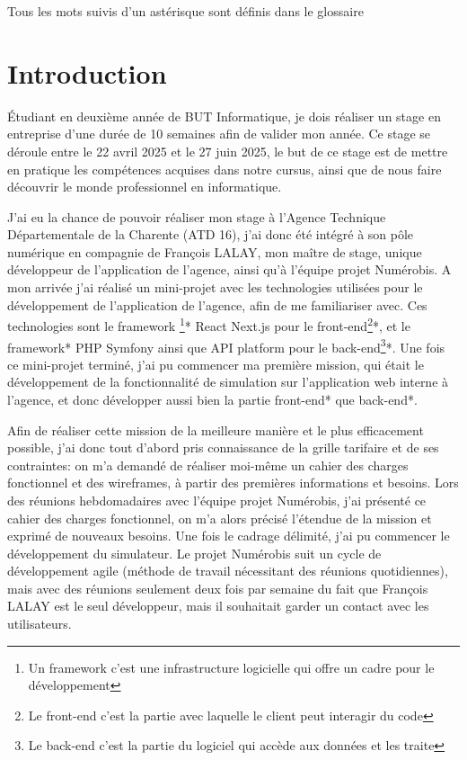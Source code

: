 \documentclass[a4paper,12pt]{report}
\begin{document}
\tableofcontents               

\newpage
\thispagestyle{empty}
\vspace*{\fill}            
\begin{center}             
Tous les mots suivis d'un astérisque sont définis dans le glossaire
\end{center}
\vspace*{\fill}            


\chapter{Introduction}         
Étudiant en deuxième année de BUT Informatique, je dois réaliser un stage en entreprise d'une durée de 10 semaines afin de valider mon année. Ce stage se déroule entre le 22 avril 2025 et le 27 juin 2025, le but de ce stage est de mettre en pratique les compétences acquises dans notre cursus, ainsi que de nous faire découvrir le monde professionnel en informatique.

\vspace{1em}

J'ai eu la chance de pouvoir réaliser mon stage à l'Agence Technique Départementale de la Charente (ATD 16), j'ai donc été intégré à son pôle numérique en compagnie de François LALAY, mon maître de stage, unique développeur de l'application de l'agence, ainsi qu'à l'équipe projet Numérobis. A mon arrivée j'ai réalisé un mini-projet avec les technologies utilisées pour le développement de l'application de l'agence, afin de me familiariser avec. Ces technologies sont le framework \footnote{Un framework c'est une infrastructure logicielle qui offre un cadre pour le développement}* React Next.js pour le front-end\footnote{Le front-end c'est la partie avec laquelle le client peut interagir du code}*, et le framework* PHP Symfony ainsi que API platform pour le back-end\footnote{Le back-end c'est la partie du logiciel qui accède aux données et les traite}*. Une fois ce mini-projet terminé, j'ai pu commencer ma première mission, qui était le développement de la fonctionnalité de simulation sur l'application web interne à l'agence, et donc développer aussi bien la partie front-end* que back-end*.

\vspace{1em}

Afin de réaliser cette mission de la meilleure manière et le plus efficacement possible, j'ai donc tout d'abord pris connaissance de la grille tarifaire et de ses contraintes: on m'a demandé de réaliser moi-même un cahier des charges fonctionnel et des wireframes, à partir des premières informations et besoins. Lors des réunions hebdomadaires avec l'équipe projet Numérobis, j'ai présenté ce cahier des charges fonctionnel, on m'a alors précisé l'étendue de la mission et exprimé de nouveaux besoins. Une fois le cadrage délimité, j'ai pu commencer le développement du simulateur. Le projet Numérobis suit un cycle de développement agile (méthode de travail nécessitant des réunions quotidiennes), 
mais avec des réunions seulement deux fois par semaine du fait que François LALAY est le seul développeur, mais il souhaitait garder un contact avec les utilisateurs.
\end{document}
